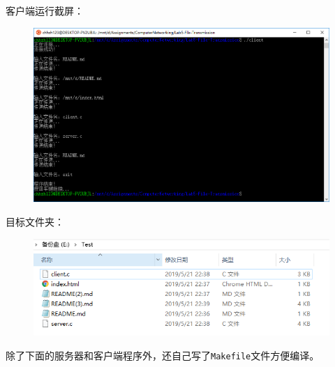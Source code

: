 \documentclass[logo,reportComp]{thesis}
\begin{document}
客户端运行截屏：
\begin{figure}[H]
\centering
\includegraphics[width=0.8\linewidth]{fig/client.PNG}
\end{figure}

目标文件夹：
\begin{figure}[H]
\centering
\includegraphics[width=0.8\linewidth]{fig/file.PNG}
\end{figure}

除了下面的服务器和客户端程序外，还自己写了\verb'Makefile'文件方便编译。
\end{document}
